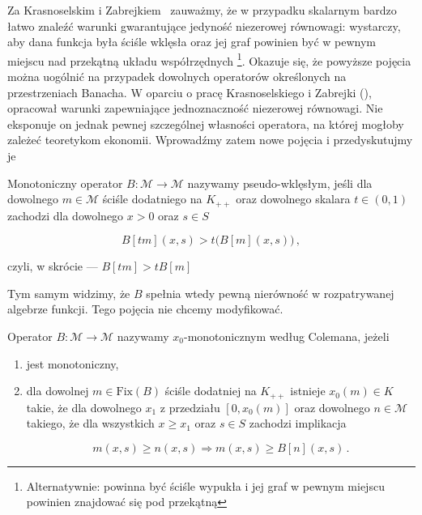 Za Krasnoselskim i Zabrejkiem~
 zauważmy, że w przypadku skalarnym bardzo łatwo znaleźć warunki gwarantujące jedyność niezerowej równowagi: wystarczy, aby dana funkcja była ściśle wklęsła oraz jej graf powinien być w pewnym miejscu nad przekątną układu współrzędnych \footnote{Alternatywnie: powinna być ściśle wypukła i jej graf w pewnym miejscu powinien znajdować się pod przekątną}. Okazuje się, że powyższe pojęcia można uogólnić na przypadek dowolnych operatorów określonych na przestrzeniach Banacha. W oparciu o pracę Krasnoselskiego i Zabrejki (\citeyear{Krasno}), \citet{Coleman1} opracował warunki zapewniające jednoznaczność niezerowej równowagi. Nie eksponuje on jednak pewnej szczególnej własności operatora, na której mogłoby zależeć teoretykom ekonomii. Wprowadźmy zatem nowe pojęcia i przedyskutujmy je

\begin{definicja}\label{pseudo_concavity}
	Monotoniczny operator $B: \mathcal{M} \rightarrow \mathcal{M}$ nazywamy pseudo-wklęsłym, jeśli dla dowolnego $m \in \mathcal{M}$ ściśle dodatniego na $K_{++}$ oraz dowolnego skalara $t \in (0,1)$ zachodzi dla dowolnego $x > 0$ oraz $s \in S$
	
\begin{equation}
	B[tm](x,s) > t\bigl( B[m](x,s) \bigl)\,,
\end{equation}	

czyli, w skrócie --- $B[tm] > tB[m]$	
\end{definicja}

Tym samym widzimy, że $B$ spełnia wtedy pewną nierówność w rozpatrywanej algebrze funkcji. Tego pojęcia nie chcemy modyfikować.

\begin{definicja}\label{x0_monotonicity}
	
	Operator $B : \mathcal{M} \rightarrow \mathcal{M}$ nazywamy $x_{0}$-monotonicznym według Colemana, jeżeli 
	
\begin{enumerate}
	\item{jest monotoniczny,}
	\item{dla dowolnej $m \in \mathrm{Fix}(B)$ ściśle dodatniej na $K_{++}$ istnieje $x_0(m) \in K$ takie, że dla dowolnego $x_1$ z przedziału $[0,x_0(m)]$ oraz dowolnego $n \in \mathcal{M}$ takiego, że dla wszystkich $x \geq x_1$ oraz $s \in S$ zachodzi implikacja

\begin{equation*}
m(x,s) \geq n(x,s)  \Longrightarrow m(x,s) \geq B[n](x,s)\,.
\end{equation*}	
	} 
\end{enumerate}	
\end{definicja}


